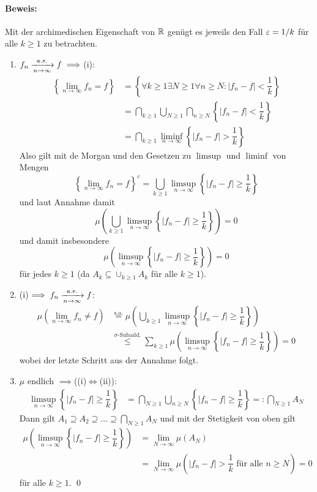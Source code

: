 \paragraph{Beweis:}Mit der archimedischen Eigenschaft  von $\mathbb{R}$ gen\"ugt es jeweils den Fall $\varepsilon=1/k$ f\"ur alle $k\geq1$ zu betrachten. 
\begin{enumerate}[label=\Roman*.]
    \item $f_n\nto{a.e.}{n\to\infty}f\implies$(i):
\begin{align*}
    \left\{\lim_{n\to\infty}f_n=f\right\}&=\left\{\forall k\geq1\exists N\geq1\forall n\geq N:|f_n-f|<\dfrac{1}{k}\right\} \\
    &=\bigcap_{k\geq1}\bigcup_{N\geq1}\bigcap_{n\geq N}\left\{|f_n-f|<\dfrac{1}{k}\right\}\\
    &=\bigcap_{k\geq1}\liminf_{n\to\infty}\left\{|f_n-f|>\dfrac{1}{k}\right\}
\end{align*}
Also gilt mit de Morgan und den Gesetzen zu $\limsup$ und $\liminf$ von Mengen
$$\left\{\lim_{n\to\infty}f_n=f\right\}^c=\bigcup_{k\geq1}\limsup_{n\to\infty}\left\{|f_n-f|\geq\dfrac{1}{k}\right\}$$
und laut Annahme damit
$$\mu\left(\bigcup_{k\geq1}\limsup_{n\to\infty}\left\{|f_n-f|\geq\dfrac{1}{k}\right\}\right)=0$$
und damit insbesondere
$$\mu\left(\limsup_{n\to\infty}\left\{|f_n-f|\geq\dfrac{1}{k}\right\}\right)=0$$
f\"ur jedes $k\geq1$ (da $A_k\subseteq\cup_{k\geq1}A_k$ f\"ur alle $k\geq1$).
    \item (i)$\implies f_n\nto{a.e.}{n\to\infty}f$:
\begin{align*}
    \mu\left(\lim_{n\to\infty}f_n\neq f\right)&\overset{\text{s.o.}}{=}\mu\left(\bigcup_{k\geq1}\limsup_{n\to\infty}\left\{|f_n-f|\geq\dfrac{1}{k}\right\}\right)\\
    &\overset{\sigma\text{-Subadd.}}{\leq}\sum_{k\geq1}\mu\left(\limsup_{n\to\infty}\left\{|f_n-f|\geq\dfrac{1}{k}\right\}\right)=0
\end{align*}
wobei der letzte Schritt aus der Annahme folgt.
    \item $\mu$ endlich $\implies$((i)$\iff$(ii)):\newline
\begin{align*}
    \limsup_{n\to\infty}\left\{|f_n-f|\geq\dfrac{1}{k}\right\}&=\bigcap_{N\geq1}\bigcup_{n\geq N}\left\{|f_n-f|\geq\dfrac{1}{k}\right\}=:\bigcap_{N\geq1}A_N
\end{align*}
Dann gilt $A_1\supseteq A_2\supseteq\hdots\supseteq\bigcap_{N\geq1}A_N$ und mit der Stetigkeit von oben gilt
\begin{align*}
    \mu\left(\limsup_{n\to\infty}\left\{|f_n-f|\geq\dfrac{1}{k}\right\}\right)&=\lim_{N\to\infty}\mu(A_N)\\
    &=\lim_{N\to\infty}\mu\left(|f_n-f|>\dfrac{1}{k}\text{ f\"ur alle }n\geq N\right)=0
\end{align*}
f\"ur alle $k\geq1$. \qed
\end{enumerate}

